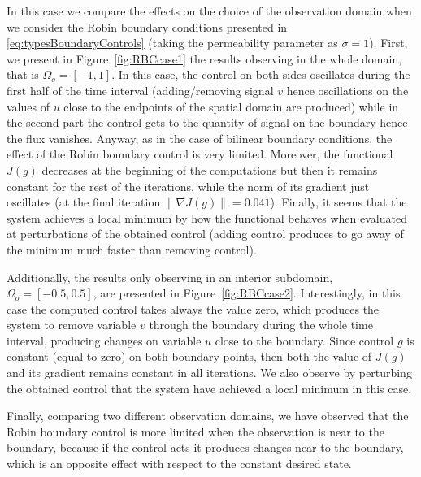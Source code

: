 \documentclass[11pt]{article}
\numberwithin{theorem}{section}
\begin{document}
In this case we compare the effects on the choice of the observation domain when we consider the Robin boundary conditions presented in \eqref{eq:typesBoundaryControls} (taking the permeability parameter as $\sigma=1$). First, we present in Figure~\ref{fig:RBCcase1} the results observing in the whole domain, that is  $\Omega_o=[-1,1]$. In this case, the control on both sides  oscillates during the first half of the time interval (adding/removing signal $v$ hence oscillations on the values of $u$ close to the endpoints of the spatial domain are produced) while in the second part  the control gets to the quantity of signal on the boundary hence the flux vanishes. Anyway, as in the case of bilinear boundary conditions, the effect of the Robin boundary control is very limited. Moreover, the functional $J(g)$ decreases at the beginning of the computations but then it remains constant for the rest of the iterations, while the norm of its gradient just oscillates (at the final iteration $\|\nabla J(g)\|=0.041$). Finally, it seems that the system achieves a local minimum by how the functional behaves when evaluated at perturbations of the obtained control (adding control produces to go away of the minimum much faster than removing control).


Additionally, the results only observing in an interior subdomain, $\Omega_o=[-0.5,0.5]$, are presented in Figure~\ref{fig:RBCcase2}. Interestingly, in this case the computed control takes always the value zero, which produces the system to remove variable $v$ through the boundary during the whole time interval, producing changes on variable $u$ close to the boundary. Since control $g$ is constant (equal to zero) on both boundary points, then both the value of $J(g)$ and its gradient remains constant in all iterations. We also observe by perturbing the obtained control that the system have achieved a local minimum in this case.

Finally, comparing two different observation domains, we have observed that the 
Robin boundary control is more limited  when the observation is near to the boundary, because if the control acts it produces changes near to the boundary, which is an opposite effect with respect to the constant desired state.
\end{document}
